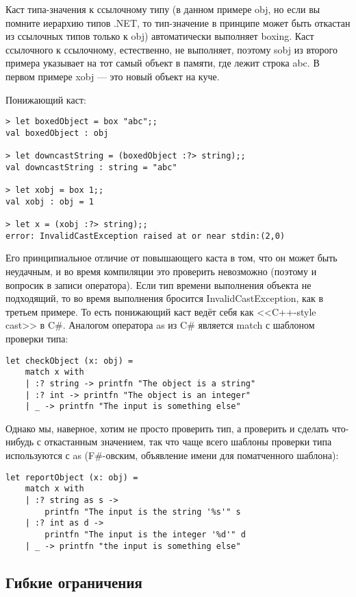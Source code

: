 \documentclass{../../text-style}
\begin{document}
Каст типа-значения к ссылочному типу (в данном примере obj, но если вы помните иерархию типов  .NET, то тип-значение в принципе может быть откастан из ссылочных типов только к obj) автоматически выполняет boxing. Каст ссылочного к ссылочному, естественно, не выполняет, поэтому sobj из второго примера указывает на тот самый объект в памяти, где лежит строка abc. В первом примере xobj --- это новый объект на куче.

Понижающий каст:

\begin{verbatim}
> let boxedObject = box "abc";;
val boxedObject : obj

> let downcastString = (boxedObject :?> string);;
val downcastString : string = "abc"

> let xobj = box 1;;
val xobj : obj = 1

> let x = (xobj :?> string);;
error: InvalidCastException raised at or near stdin:(2,0)
\end{verbatim}

Его принципиальное отличие от повышающего каста в том, что он может быть неудачным, и во время компиляции это проверить невозможно (поэтому и вопросик в записи оператора). Если тип времени выполнения объекта не подходящий, то во время выполнения бросится InvalidCastException, как в третьем примере. То есть понижающий каст ведёт себя как <<C++-style cast>> в C\#. Аналогом оператора as из C\# является match с шаблоном проверки типа:

\begin{verbatim}
let checkObject (x: obj) =
    match x with
    | :? string -> printfn "The object is a string"
    | :? int -> printfn "The object is an integer"
    | _ -> printfn "The input is something else"
\end{verbatim}

Однако мы, наверное, хотим не просто проверить тип, а проверить и сделать что-нибудь с откастанным значением, так что чаще всего шаблоны проверки типа используются с as (F\#-овским, объявление имени для поматченного шаблона):

\begin{verbatim}
let reportObject (x: obj) =
    match x with
    | :? string as s -> 
        printfn "The input is the string '%s'" s
    | :? int as d -> 
        printfn "The input is the integer '%d'" d
    | _ -> printfn "the input is something else"
\end{verbatim}

\subsection{Гибкие ограничения}
\end{document}
